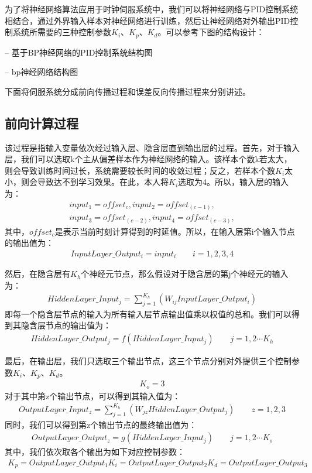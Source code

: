 为了将神经网络算法应用于时钟伺服系统中，我们可以将神经网络与PID控制系统相结合，通过外界输入样本对神经网络进行训练，然后让神经网络对外输出PID控制系统所需要的三种控制参数$K_{i}$、$K_{p}$、$K_{d}$。可以参考下图的结构设计：

-- 基于BP神经网络的PID控制系统结构图

-- bp神经网络结构图

下面将伺服系统分成前向传播过程和误差反向传播过程来分别讲述。

\subsection{前向计算过程}
该过程是指输入变量依次经过输入层、隐含层直到输出层的过程。首先，对于输入层，我们可以选取k个主从偏差样本作为神经网络的输入。该样本个数k若太大，则会导致训练时间过长，系统需要较长时间的收敛过程；反之，若样本个数$K_{i}$太小，则会导致达不到学习效果。在此，本人将$K_{i}$选取为4。所以，输入层的输入为：
\begin{align}
	input_{1} = offset_{c}, input_{2} = offset_{(c-1)}, \\
	input_{3} = offset_{(c-2)}, input_{4} = offset_{(c-3)}, 
\end{align}
其中，$offset_{c}$是表示当前时刻计算得到的时延值。所以，在输入层第i个输入节点的输出值为：
\begin{align}
	InputLayer\_Output_{i} = input_{i} \qquad i = 1, 2, 3, 4
\end{align}

然后，在隐含层有$K_{h}$个神经元节点，那么假设对于隐含层的第j个神经元的输入为：
\begin{align}
	HiddenLayer\_Input_{j} = \sum_{j=1}^{K_{h}}(W_{ij}InputLayer\_Output_{i})
\end{align}
即每一个隐含层节点的输入为所有输入层节点输出值乘以权值的总和。我们可以得到其隐含层节点的输出值为：
\begin{align}
	HiddenLayer\_Output_{j} = f(HiddenLayer\_Input_{j}) \qquad j = 1, 2 \cdots K_{h}
\end{align}

最后，在输出层，我们只选取三个输出节点，这三个节点分别对外提供三个控制参数$K_{i}$、$K_{p}$、$K_{d}$。
\begin{align}
K_{o} = 3
\end{align}
对于其中第z个输出节点，可以得到其输入值为：
\begin{align}
OutputLayer\_Input_{z} = \sum_{j=1}^{K_{h}}(W_{jz}HiddenLayer\_Output_{j}) \qquad z = 1, 2, 3
\end{align}
同时，我们可以得到第z个输出节点的最终输出值为：
\begin{align}
OutputLayer\_Output_{z} = g(HiddenLayer\_Input_{j}) \qquad j = 1, 2 \cdots K_{o}
\end{align}
其中，我们依次取各个输出为如下对应控制参数：
\begin{align}
K_{p} = OutputLayer\_Output_{1}
K_{i} = OutputLayer\_Output_{2}
K_{d} = OutputLayer\_Output_{3}
\end{align}

